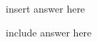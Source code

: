 \documentclass[
    ngerman,american
    ]{scrartcl}
\newcommand{\lang}{en}
\begin{document}
\begin{description}[style=unboxed]
            \item [\questionThree{\lang}]
                insert answer here

            \item [\questionFour{\lang}]
                include answer here
        \end{description}
        
\end{document}

